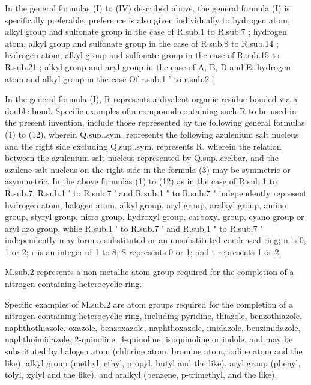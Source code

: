 \documentclass[11pt,a4paper]{article}
\begin{document}
In the general formulas (I) to (IV) described above, the general formula (I) is specifically preferable; preference is also given individually to hydrogen atom, alkyl group and sulfonate group in the case of R.sub.1 to R.sub.7 ; hydrogen atom, alkyl group and sulfonate group in the case of R.sub.8 to R.sub.14 ; hydrogen atom, alkyl group and sulfonate group in the case of R.sub.15 to R.sub.21 ; alkyl group and aryl group in the case of A, B, D and E; hydrogen atom and alkyl group in the case Of r.sub.1 ' to r.sub.2 '.

In the general formula (I), R represents a divalent organic residue bonded via a double bond. Specific examples of a compound containing such R to be used in the present invention, include those represented by the following general formulas (1) to (12), wherein Q.sup..sym. represents the following azulenium salt nucleus and the right side excluding Q.sup..sym. represents R. wherein the relation between the azulenium salt nucleus represented by Q.sup..crclbar.  and the azulene salt nucleus on the right side in the formula (3) may be symmetric or asymmetric. In the above formulas (1) to (12) as in the case of R.sub.1 to R.sub.7, R.sub.1 ' to R.sub.7 ' and R.sub.1 " to R.sub.7 " independently represent hydrogen atom, halogen atom, alkyl group, aryl group, aralkyl group, amino group, styryl group, nitro group, hydroxyl group, carboxyl group, cyano group or aryl azo group, while R.sub.1 ' to R.sub.7 ' and R.sub.1 " to R.sub.7 " independently may form a substituted or an unsubstituted condensed ring; n is 0, 1 or 2; r is an integer of 1 to 8; S represents 0 or 1; and t represents 1 or 2.

M.sub.2 represents a non-metallic atom group required for the completion of a nitrogen-containing heterocyclic ring.

Specific examples of M.sub.2 are atom groups required for the completion of a nitrogen-containing heterocyclic ring, including pyridine, thiazole, benzothiazole, naphthothiazole, oxazole, benzoxazole, naphthoxazole, imidazole, benzimidazole, naphthoimidazole, 2-quinoline, 4-quinoline, isoquinoline or indole, and may be substituted by halogen atom (chlorine atom, bromine atom, iodine atom and the like), alkyl group (methyl, ethyl, propyl, butyl and the like), aryl group (phenyl, tolyl, xylyl and the like), and aralkyl (benzene, p-trimethyl, and the like).
\end{document}
